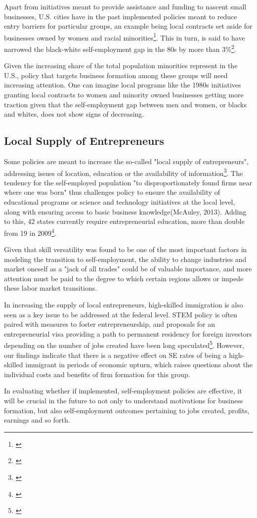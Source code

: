 Apart from initiatives meant to provide assistance and funding to nascent small businesses, U.S. cities have in the past implemented policies meant to reduce entry barriers for particular groups, an example being local contracts set aside for businesses owned by women and racial minorities\footnote{\cite{ChatterjiGlaeserKerr2014}\cite{Lerner2009}}. This in turn, is said to have narrowed the black-white self-employment gap in the 80s by more than 3\%\footnote{\cite{ChatterjiGlaeserKerr2014}}.

Given the increasing share of the total population minorities represent in the U.S., policy that targets business formation among these groups will need increasing attention. One can imagine local programs like the 1980s initiatives granting local contracts to women and minority owned businesses getting more traction given that the self-employment gap between men and women, or blacks and whites, does not show signs of decreasing.  

\subsection{Local Supply of Entrepreneurs}

Some policies are meant to increase the so-called "local supply of entrepreneurs", addressing issues of location, education or the availability of information\footnote{\cite{Lerner2009}}. The tendency for the self-employed population "to disproportionately found firms near where one was born" thus challenges policy to ensure the availability of educational programs or science and technology initiatives at the local level, along with ensuring access to basic business knowledge(McAuley, 2013). Adding to this, 42 states currently require entrepreneurial education, more than double from 19 in 2009\footnote{\cite{ChatterjiGlaeserKerr2014}}. 

Given that skill versatility was found to be one of the most important factors in modeling the transition to self-employment, the ability to change industries and market oneself as a "jack of all trades" could be of valuable importance, and more attention must be paid to the degree to which certain regions allows or impede these labor market transitions.

In increasing the supply of local entrepreneurs, high-skilled immigration is also seen as a key issue to be addressed at the federal level. STEM policy is often paired with measures to foster entrepreneurship, and proposals for an entrepreneurial visa providing a path to permanent residency for foreign investors depending on the number of jobs created have been long speculated\footnote{\cite{Dalziel2008}\cite{ChatterjiGlaeserKerr2014}}. However, our findings indicate that there is a negative effect on SE rates of being a high-skilled immigrant in periods of economic upturn, which raises questions about the individual costs and benefits of firm formation for this group.

In evaluating whether if implemented, self-employment policies are effective, it will be crucial in the future to not only to understand motivations for business formation, but also self-employment outcomes pertaining to jobs created, profits, earnings and so forth. 














